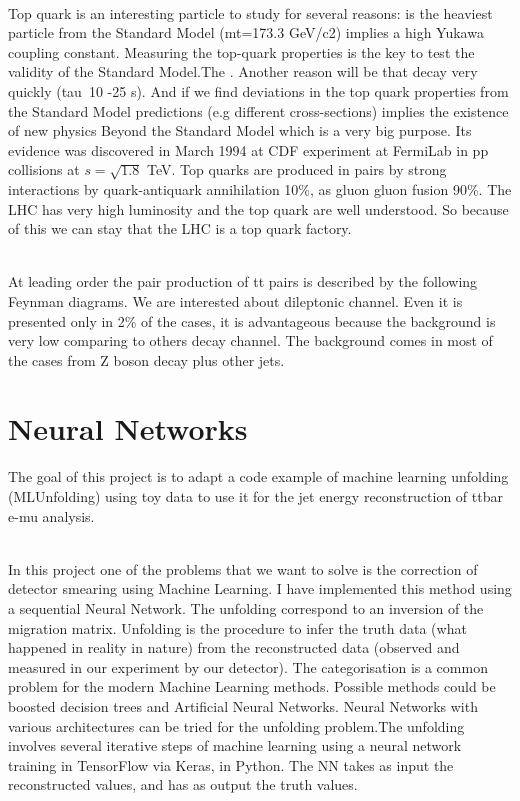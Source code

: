 \documentclass[a4paper,11pt,twoside]{article}
\begin{document}
\ \\Top quark is an interesting particle to study for several reasons: is the heaviest particle from the Standard Model (mt=173.3 GeV/c2) implies a high Yukawa coupling constant. Measuring the top-quark properties is the key to test the validity of the Standard Model.The . Another reason will be that decay very quickly (tau~10 -25 s). And if we find deviations in the top quark properties from the Standard Model predictions (e.g different cross-sections) implies the existence of new physics Beyond the Standard Model which is a very big purpose. Its evidence was discovered in March 1994 at CDF experiment at FermiLab in pp collisions at $s=\sqrt{1.8}$ TeV. Top quarks are produced in pairs by strong interactions by quark-antiquark annihilation 10\%, as gluon gluon fusion 90\%. The LHC has very high luminosity and the top quark are well understood. So because of this we can stay that the LHC is a top quark factory. 

\ \\At leading order the pair production of tt pairs is described by the following Feynman diagrams. We are interested about dileptonic channel. Even it is presented only in 2\% of the cases, it is advantageous because the background is very low comparing to others decay channel. The background comes in most of the cases from Z boson decay plus other jets.

\section{Neural Networks}

The goal of this project is to adapt a code example of machine learning unfolding (MLUnfolding) using toy data to use it for the jet energy reconstruction of ttbar e-mu analysis.

\ \\In this project one of the problems that we want to solve is the correction of detector smearing using Machine Learning. I have implemented this method using a sequential Neural Network. The unfolding correspond to an inversion of the migration matrix. Unfolding is the procedure to infer the truth data (what happened in reality in nature) from the reconstructed data (observed and measured in our experiment by our detector). The categorisation is a common problem for the modern Machine Learning methods. Possible methods could be boosted decision trees and Artificial Neural Networks. Neural Networks with various architectures can be tried for the unfolding problem.The unfolding involves several iterative steps of machine learning using a neural network training in TensorFlow via Keras, in Python. The NN takes as input the reconstructed values, and has as output the truth values.
\end{document}
